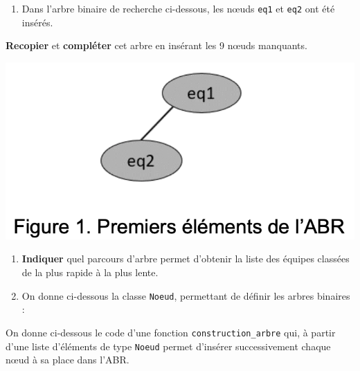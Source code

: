 \begin{enumerate}
\def\labelenumi{\arabic{enumi}.}
\setcounter{enumi}{7}
\tightlist
\item
  Dans l'arbre binaire de recherche ci-dessous, les nœuds \texttt{eq1}
  et \texttt{eq2} ont été insérés.
\end{enumerate}

\textbf{Recopier} et \textbf{compléter} cet arbre en insérant les 9
nœuds manquants.

\includegraphics{24-NSIJ1ME1-Ex3-03.png}

\begin{enumerate}
\def\labelenumi{\arabic{enumi}.}
\setcounter{enumi}{8}
\item
  \textbf{Indiquer} quel parcours d'arbre permet d'obtenir la liste des
  équipes classées de la plus rapide à la plus lente.
\item
  On donne ci-dessous la classe \texttt{Noeud}, permettant de définir
  les arbres binaires :
\end{enumerate}

\begin{Shaded}
\begin{Highlighting}[]
 
    \NormalTok{(}\OperatorTok{=} \OperatorTok{=} \NormalTok{):}
       \OperatorTok{=}
       \OperatorTok{=}
       \OperatorTok{=}
\end{Highlighting}
\end{Shaded}

On donne ci-dessous le code d'une fonction \texttt{construction\_arbre}
qui, à partir d'une liste d'éléments de type \texttt{Noeud} permet
d'insérer successivement chaque nœud à sa place dans l'ABR.

